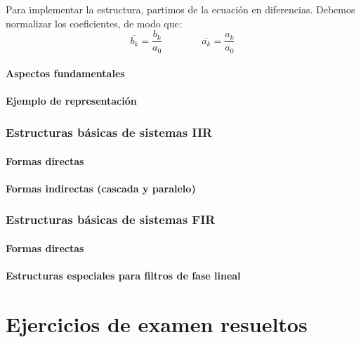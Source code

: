 \documentclass[a4paper,oneside]{book}
\begin{document}
Para implementar la estructura, partimos de la ecuación en diferencias. Debemos normalizar los coeficientes, de modo que:
\[ \overline{b_k} = \frac{b_k}{a_0} \qquad \qquad \overline{a_k} = \frac{a_k}{a_0} \]
\subsubsection{Aspectos fundamentales}
\subsubsection{Ejemplo de representación}

\subsection{Estructuras básicas de sistemas IIR}
\subsubsection{Formas directas}
\subsubsection{Formas indirectas (cascada y paralelo)}

\subsection{Estructuras básicas de sistemas FIR}
\subsubsection{Formas directas}
\subsubsection{Estructuras especiales para filtros de fase lineal}

\chapter{Ejercicios de examen resueltos}
\end{document}
